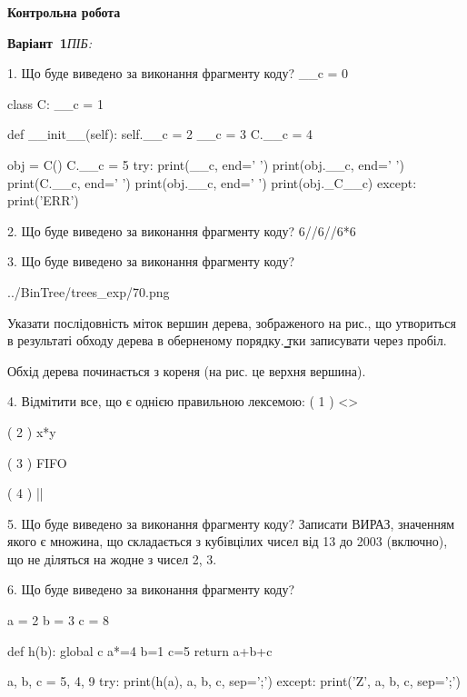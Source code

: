 \documentclass[11pt]{article}
\begin{document}
{\large\textbf{Контрольна робота}}

\textbf{Варіант \No\,1}\hfill \textit{ПІБ:}\,\underline{\hspace{60mm}}
\vspace{4mm}

1. Що буде виведено за виконання фрагменту коду?
__c = 0

class C:
    __c = 1
    
    def __init__(self):
        self.__c = 2
        __c = 3
        C.__c = 4

obj = C()
C.__c = 5
try:
    print(__c, end=' ')
    print(obj.__c, end=' ')
    print(C.__c, end=' ')
    print(obj.__c, end=' ')
    print(obj._C__c)
except:
    print('ERR')


2. Що буде виведено за виконання фрагменту коду?
6//6//6*6

3. Що буде виведено за виконання фрагменту коду?

\begin{center}
	{../BinTree/trees_exp/70.png}
\end{center}
Указати послідовність міток вершин дерева, зображеного на рис., що утвориться в результаті обходу дерева в оберненому порядку. ̳тки записувати через пробіл.\par Обхід дерева починається з кореня (на рис. це верхня вершина).

4. %
Відмітити все, що є однією правильною лексемою:
( 1 ) <>

( 2 ) x*y

( 3 ) FIFO

( 4 ) ||


5. Що буде виведено за виконання фрагменту коду?
Записати ВИРАЗ, значенням якого є множина, що складається з кубівцілих чисел від 13 до 2003 (включно), що не діляться на жодне з чисел 2, 3.


6. Що буде виведено за виконання фрагменту коду?

a = 2
b = 3
c = 8

def h(b):
global c    a*=4
    b=1
    c=5
    return a+b+c

a, b, c = 5, 4, 9
try:
    print(h(a), a, b, c, sep=';')
except:
    print('Z', a, b, c, sep=';')
\end{document}
